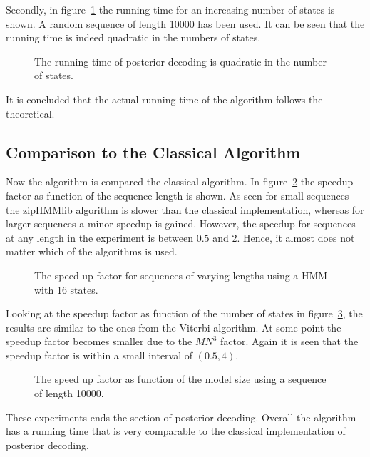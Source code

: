 Secondly, in figure~\ref{fig:posterior_k} the running time for an increasing
number of states is shown. A random sequence of length 10000 has been used. It
can be seen that the running time is indeed quadratic in the numbers of states.

\begin{figure}
  \centering
  
  \caption{The running time of posterior decoding is quadratic in the number of
    states.}
  \label{fig:posterior_k}
\end{figure}

It is concluded that the actual running time of the algorithm follows the
theoretical.

\subsection{Comparison to the Classical Algorithm}

Now the algorithm is compared the classical algorithm. In
figure~\ref{fig:posterior_speedup_vs_sequence_length} the speedup factor as
function of the sequence length is shown. As seen for small sequences the
zipHMMlib algorithm is slower than the classical implementation, whereas for
larger sequences a minor speedup is gained. However, the speedup for sequences
at any length in the experiment is between $0.5$ and 2. Hence, it almost does
not matter  which of the algorithms is used.

\begin{figure}
  \centering
  
  \caption{The speed up factor for sequences of varying lengths using a HMM
    with 16 states.}
  \label{fig:posterior_speedup_vs_sequence_length}
\end{figure}

Looking at the speedup factor as function of the number of states in
figure~\ref{fig:posterior_speedup_vs_k}, the results are similar to the ones
from the Viterbi algorithm. At some point the speedup factor becomes smaller
due to the $M N^3$ factor. Again it is seen that the speedup factor is within a
small interval of $(0.5, 4)$.

\begin{figure}
  \centering
  
  \caption{The speed up factor as function of the model size using a sequence
    of length 10000.}
  \label{fig:posterior_speedup_vs_k}
\end{figure}

These experiments ends the section of posterior decoding. Overall the algorithm
has a running time that is very comparable to the classical implementation of
posterior decoding.


